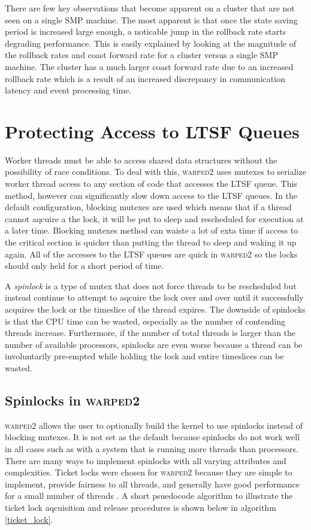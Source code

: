 \documentclass[11pt]{book}
\begin{document}
There are few key observations that become apparent on a cluster that are not seen on a single SMP
machine.  The most apparent is that once the state saving period is increased large enough, a
noticable jump in the rollback rate starts degrading performance.  This is easily explained by
looking at the magnitude of the rollback rates and coast forward rate for a cluster versus a single
SMP machine.  The cluster has a much larger coast forward rate due to an increased rollback rate
which is a result of an increased discrepancy in communication latency and event processing time.

\section{Protecting Access to LTSF Queues}

Worker threads must be able to access shared data structures without the possibility of race
conditions.  To deal with this, \textsc{warped2} uses mutexes to serialize worker thread access to
any section of code that accesses the LTSF queue.  This method, however can significantly slow down
access to the LTSF queues.  In the default configuration, blocking mutexes are used which means that
if a thread cannot aqcuire a the lock, it will be put to sleep and rescheduled for execution at a
later time.  Blocking mutexes method can waiste a lot of exta time if access to the critical section
is quicker than putting the thread to sleep and waking it up again.  All of the accesses to the LTSF
queues are quick in \textsc{warped2} so the locks should only held for a short period of time.

A \emph{spinlock} is a type of mutex that does not force threads to be rescheduled but
instead continue to attempt to aqcuire the lock over and over until it successfully acquires
the lock or the timeslice of the thread expires.  The downside of spinlocks is that the CPU time
can be wasted, especially as the number of contending threads increase.  Furthermore, if the
number of total threads is larger than the number of available processors, spinlocks are
even worse because a thread can be involuntarily pre-empted while holding the lock and entire
timeslices can be wasted.

\subsection{Spinlocks in \textsc{warped2}}

\textsc{warped2} allows the user to optionally build the kernel to use spinlocks instead of blocking
mutexes.  It is not set as the default because spinlocks do not work well in all cases such as with
a system that is running more threads than processors.  There are many ways to implement spinlocks
with all varying attributes and complexities.  Ticket locks were chosen for \textsc{warped2} because
they are simple to implement, provide fairness to all threads, and generally have good performance
for a small number of threads \cite{lockless-10}.  A short psuedocode algorithm to illustrate the
ticket lock aqcuisition and release procedures is shown below in algorithm \ref{ticket_lock}.
\end{document}
